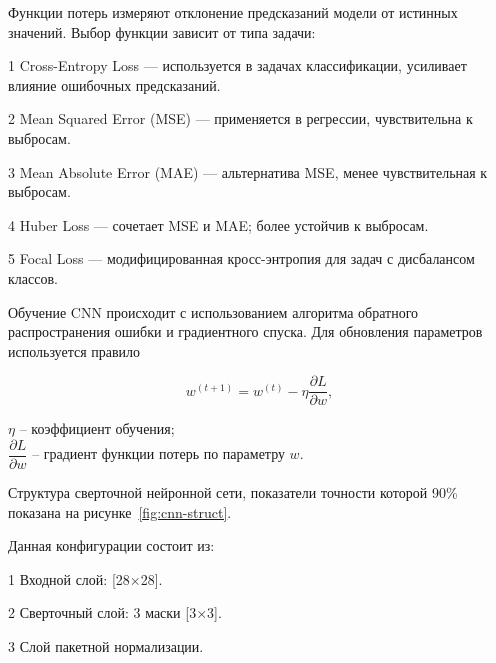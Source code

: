 \anonsection{}Функции потерь измеряют отклонение предсказаний модели от 
истинных значений. Выбор функции зависит от типа задачи:

    1 {Cross-Entropy Loss} — используется в задачах классификации, усиливает 
    влияние ошибочных предсказаний.

    2 {Mean Squared Error (MSE)} — применяется в регрессии, чувствительна к 
    выбросам.
    
    3 {Mean Absolute Error (MAE)} — альтернатива MSE, менее чувствительная к 
    выбросам.

    4 {Huber Loss} — сочетает MSE и MAE; более устойчив к выбросам.

    5 {Focal Loss} — модифицированная кросс-энтропия для задач с дисбалансом 
    классов.


\anonsection{}Обучение CNN происходит с использованием алгоритма обратного 
распространения ошибки и градиентного спуска. Для обновления параметров 
используется правило

\begin{equation}
    w^{(t+1)} = w^{(t)} - \eta \frac{\partial L}{\partial w},
\end{equation}

  \( \eta \) – коэффициент обучения;\\
\hphantom{где} \( \dfrac{\partial L}{\partial w} \) – градиент функции потерь 
по параметру \( w \).

\anonsection{}Структура сверточной нейронной сети, показатели точности 
которой 90\% показана на рисунке~\ref{fig:cnn-struct}\cite{Giardino}.


Данная конфигурации состоит из: 

  1 Входной слой: [28$\times$28].

  2 Сверточный слой: 3 маски [3$\times$3]. 

  3 Слой пакетной нормализации. 

